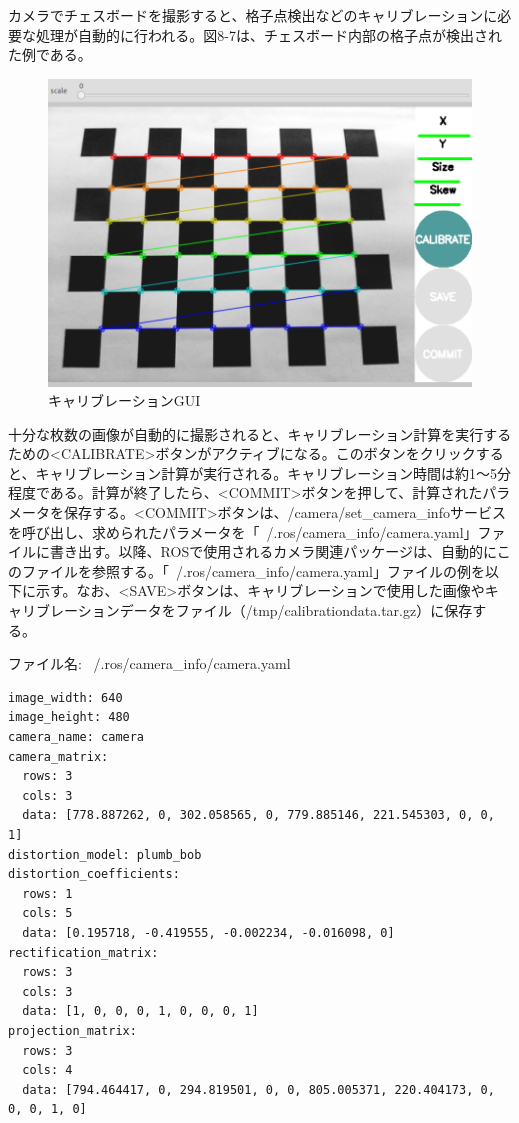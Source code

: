カメラでチェスボードを撮影すると、格子点検出などのキャリブレーションに必要な処理が自動的に行われる。図8-7は、チェスボード内部の格子点が検出された例である。

\begin{figure}[ht]
  \centering
  \includegraphics[width=\columnwidth]{pictures/chapter8/pic_08_07.png}
  \caption{キャリブレーションGUI}
\end{figure}

十分な枚数の画像が自動的に撮影されると、キャリブレーション計算を実行するための<CALIBRATE>ボタンがアクティブになる。このボタンをクリックすると、キャリブレーション計算が実行される。キャリブレーション時間は約1〜5分程度である。計算が終了したら、<COMMIT>ボタンを押して、計算されたパラメータを保存する。<COMMIT>ボタンは、/camera/set\_camera\_infoサービスを呼び出し、求められたパラメータを「~/.ros/camera\_info/camera.yaml」ファイルに書き出す。以降、ROSで使用されるカメラ関連パッケージは、自動的にこのファイルを参照する。「~/.ros/camera\_info/camera.yaml」ファイルの例を以下に示す。なお、<SAVE>ボタンは、キャリブレーションで使用した画像やキャリブレーションデータをファイル（/tmp/calibrationdata.tar.gz）に保存する。

ファイル名: ~/.ros/camera\_info/camera.yaml
\begin{lstlisting}[language=ROS]
image_width: 640
image_height: 480
camera_name: camera
camera_matrix:
  rows: 3
  cols: 3
  data: [778.887262, 0, 302.058565, 0, 779.885146, 221.545303, 0, 0, 1]
distortion_model: plumb_bob
distortion_coefficients:
  rows: 1
  cols: 5
  data: [0.195718, -0.419555, -0.002234, -0.016098, 0]
rectification_matrix:
  rows: 3
  cols: 3
  data: [1, 0, 0, 0, 1, 0, 0, 0, 1]
projection_matrix:
  rows: 3
  cols: 4
  data: [794.464417, 0, 294.819501, 0, 0, 805.005371, 220.404173, 0, 0, 0, 1, 0]
\end{lstlisting}

